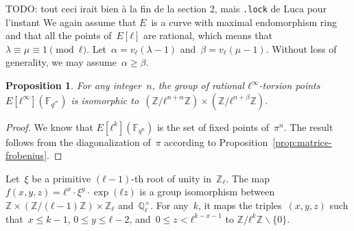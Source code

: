 \documentclass{lms}
\newcommand{\todo}[1]{{\color{red}TODO: #1}}
\newtheorem{prop}[thm]{Proposition}
\newcommand{\F}{\mathbb{F}}
\begin{document}
\todo{tout ceci irait bien à la fin de la section 2, mais \texttt{.lock}
de Luca pour l'instant}
We again assume that $E$~is a curve with maximal endomorphism ring
and that all the points of~$E[ℓ]$ are rational,
which means that~$λ ≡ μ ≡ 1 \pmod{ℓ}$.
Let~$α = v_{ℓ} (λ - 1)$ and~$β = v_{ℓ} (μ - 1)$.
Without loss of generality, we may assume~$α ≥ β$.

\begin{prop}\label{prop:l-torsion-rationnelle}
For any integer~$n$,
the group of rational $ℓ^∞$-torsion points~$E[ℓ^∞](\F_{q^{ℓ^n}})$
is isomorphic to~$(ℤ/ℓ^{n+α} ℤ) × (ℤ/ℓ^{n + β} ℤ)$.
\end{prop}
\begin{proof}
We know that $E[ℓ^k](\F_{q^n})$ is the set of fixed points of~$π^n$.
The result follows from the diagonalization of~$π$
according to Proposition~\ref{prop:matrice-frobenius}.
\end{proof}

% 

Let~$ξ$ be a primitive $(ℓ-1)$-th root of unity in~$ℤ_ℓ$.
The map~$f(x, y, z) = ℓ^x· ξ^y· \exp (ℓ z)$
is a group isomorphism between~$ℤ × (ℤ/(ℓ-1) ℤ) × ℤ_ℓ$ and~$ℚ_ℓ^{×}$.
For any~$k$, it maps the triples~$(x, y, z)$
such that~$x ≤ k-1$, $0 ≤ y ≤ ℓ-2$, and~$0 ≤ z < ℓ^{k - x - 1}$
to $ℤ/ℓ^{k} ℤ ∖ \{0\}$.
\end{document}
